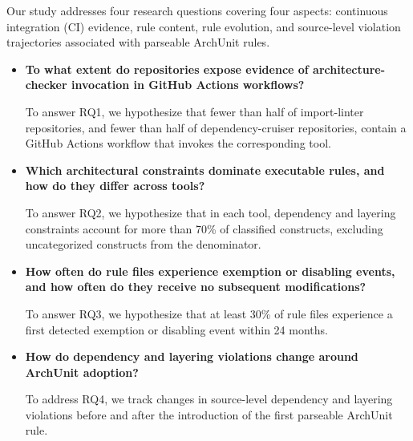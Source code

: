 Our study addresses four research questions covering 
four aspects: continuous integration (CI) evidence, 
rule content, rule evolution, and source-level violation 
trajectories associated with parseable ArchUnit rules.

\begin{itemize}
    \item \textbf{To what extent do repositories expose evidence of architecture-checker invocation in GitHub Actions workflows?}

    To answer RQ1, we hypothesize that fewer than
    half of import-linter repositories, and fewer than half of
    dependency-cruiser repositories, contain a GitHub Actions
    workflow that invokes the corresponding tool.

    \item \textbf{Which architectural constraints dominate
    executable rules, and how do they differ across tools?}

    To answer RQ2, we hypothesize that in each tool,
    dependency and layering constraints account for more than 70\%
    of classified constructs, excluding uncategorized constructs
    from the denominator.

    \item \textbf{How often do rule files experience exemption
    or disabling events, and how often do they receive no
    subsequent modifications?}

    To answer RQ3, we hypothesize that at least 30\% of
    rule files experience a first detected exemption or
    disabling event within 24 months.

    \item \textbf{How do dependency and layering violations
    change around ArchUnit adoption?}

    To address RQ4, we track changes in source-level
    dependency and layering violations before and
    after the introduction of the first parseable
    ArchUnit rule.
\end{itemize}


